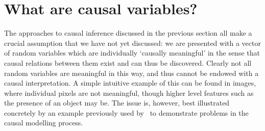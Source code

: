 %
%
%




\section{What are causal variables?}\label{sec:causality-what-are-causal-vars}

The approaches to causal inference discussed in the previous section all make a crucial assumption that we have not yet discussed: we are presented with a vector of random variables which are individually `causally meaningful' in the sense that causal relations between them exist and can thus be discovered. 
Clearly not all random variables are meaningful in this way, and thus cannot be endowed with a causal interpretation.
A simple intuitive example of this can be found in images, where individual pixels are not meaningful, though higher level features such as the presence of an object may be.
The issue is, however, best illustrated concretely by an example previously used by~\cite{spirtes2004causal} to demonstrate problems in the causal modelling process.


